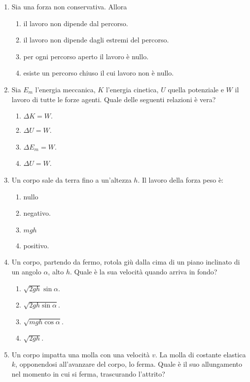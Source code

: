 \documentclass{article}
\begin{document}
\begin{enumerate}
  \item Sia  una forza non conservativa. Allora
  \begin{enumerate}[label=\Alph*.]
    \item il lavoro non dipende dal percorso.
    \item il lavoro non dipende dagli estremi del percorso.
    \item per ogni percorso aperto il lavoro è nullo.
    \item esiste un percorso chiuso il cui lavoro non è nullo.
  \end{enumerate}
  \item Sia $E_m$ l'energia meccanica, $K$ l'energia cinetica, $U$ quella potenziale e $W$ il lavoro di tutte le forze agenti. Quale delle seguenti relazioni è vera?
  \begin{enumerate}[label=\Alph*.]
    \item $\Delta K=W.$
    \item $\Delta U=W$.
    \item $\Delta E_m=W$.
    \item $\Delta U=W$.
  \end{enumerate}
  \item Un corpo sale da terra fino a un'altezza $h$. Il lavoro della forza peso è:
  \begin{enumerate}[label=\Alph*.]
    \item nullo
    \item negativo.
    \item $mgh$
    \item positivo.
  \end{enumerate}
  \item Un corpo, partendo da fermo, rotola giù dalla cima di un piano inclinato di un angolo $\alpha$, alto $h$. Quale è la sua velocità quando arriva in fondo?
  \begin{enumerate}[label=\Alph*.]
    \item $\sqrt{2gh}\sin\alpha$.
    \item $\sqrt{2gh\sin\alpha}$.
    \item $\sqrt{mgh\cos\alpha}$.
    \item $\sqrt{2gh}$.
  \end{enumerate}
  \item Un corpo impatta una molla con una velocità $v$. La molla di costante elastica $k$, opponendosi all'avanzare del corpo, lo ferma. Quale è il suo allungamento nel momento in cui si ferma, trascurando l'attrito?
  \begin{enumerate}[label=\Alph*.]

\end{enumerate}
\end{enumerate}
\end{document}
